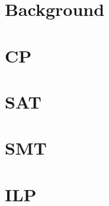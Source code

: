 \documentclass[a4paper, 11pt]{article}
\begin{document}
\section{Background}\label{chapter:background}
    
    \newpage

\section{CP}\label{chapter:CP}
    
    \newpage

\section{SAT}\label{chapter:SAT}
    
    \newpage

\section{SMT}\label{chapter:SMT}
    
    \newpage


\section{ILP}\label{chapter:ILP}
    
    \newpage

% 
% 
\nocite{*}
\printbibliography

\end{document}
